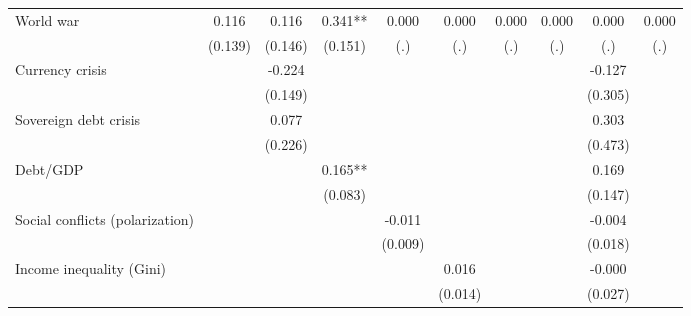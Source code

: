 \begin{tabular}{l*{9}{c}}
World war                       &       0.116   &       0.116   &       0.341** &       0.000   &       0.000   &       0.000   &       0.000   &       0.000   &       0.000   \\
                                &     (0.139)   &     (0.146)   &     (0.151)   &         (.)   &         (.)   &         (.)   &         (.)   &         (.)   &         (.)   \\
Currency crisis                 &               &      -0.224   &               &               &               &               &               &      -0.127   &               \\
                                &               &     (0.149)   &               &               &               &               &               &     (0.305)   &               \\
Sovereign debt crisis           &               &       0.077   &               &               &               &               &               &       0.303   &               \\
                                &               &     (0.226)   &               &               &               &               &               &     (0.473)   &               \\
Debt/GDP                        &               &               &       0.165** &               &               &               &               &       0.169   &               \\
                                &               &               &     (0.083)   &               &               &               &               &     (0.147)   &               \\
Social conflicts (polarization) &               &               &               &      -0.011   &               &               &               &      -0.004   &               \\
                                &               &               &               &     (0.009)   &               &               &               &     (0.018)   &               \\
Income inequality (Gini)        &               &               &               &               &       0.016   &               &               &      -0.000   &               \\
                                &               &               &               &               &     (0.014)   &               &               &     (0.027)   &               \\

\end{tabular}
